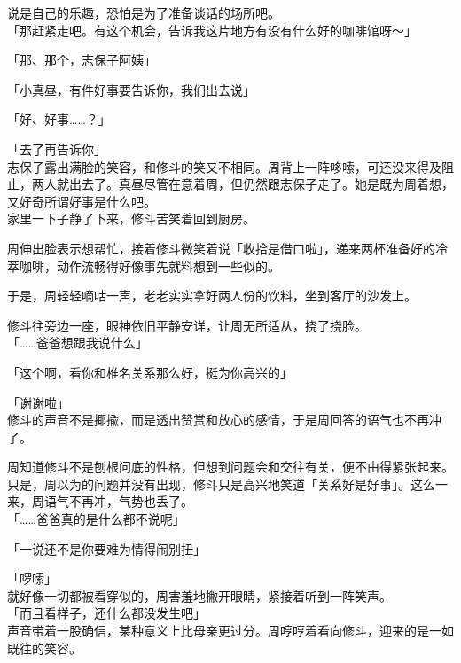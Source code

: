 说是自己的乐趣，恐怕是为了准备谈话的场所吧。\\

「那赶紧走吧。有这个机会，告诉我这片地方有没有什么好的咖啡馆呀～」

「那、那个，志保子阿姨」

「小真昼，有件好事要告诉你，我们出去说」

「好、好事……？」

「去了再告诉你」\\

志保子露出满脸的笑容，和修斗的笑又不相同。周背上一阵哆嗦，可还没来得及阻止，两人就出去了。真昼尽管在意着周，但仍然跟志保子走了。她是既为周着想，又好奇所谓好事是什么吧。\\

家里一下子静了下来，修斗苦笑着回到厨房。

周伸出脸表示想帮忙，接着修斗微笑着说「收拾是借口啦」，递来两杯准备好的冷萃咖啡，动作流畅得好像事先就料想到一些似的。

于是，周轻轻嘀咕一声，老老实实拿好两人份的饮料，坐到客厅的沙发上。

修斗往旁边一座，眼神依旧平静安详，让周无所适从，挠了挠脸。\\

「……爸爸想跟我说什么」

「这个啊，看你和椎名关系那么好，挺为你高兴的」

「谢谢啦」\\

修斗的声音不是揶揄，而是透出赞赏和放心的感情，于是周回答的语气也不再冲了。

周知道修斗不是刨根问底的性格，但想到问题会和交往有关，便不由得紧张起来。\\

只是，周以为的问题并没有出现，修斗只是高兴地笑道「关系好是好事」。这么一来，周语气不再冲，气势也丢了。\\

「……爸爸真的是什么都不说呢」

「一说还不是你要难为情得闹别扭」

「啰嗦」\\

就好像一切都被看穿似的，周害羞地撇开眼睛，紧接着听到一阵笑声。\\

「而且看样子，还什么都没发生吧」\\

声音带着一股确信，某种意义上比母亲更过分。周哼哼着看向修斗，迎来的是一如既往的笑容。\\

